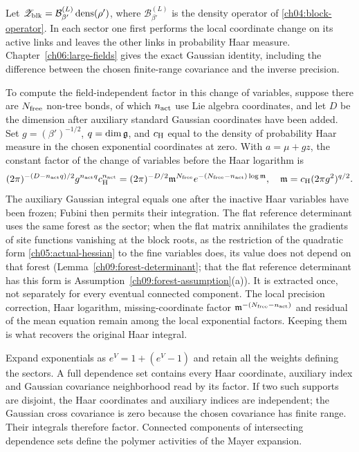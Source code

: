 Let
$\mathscr Z_{\rm blk}=\mathcal B^{(L)}_{\beta'}\operatorname{dens}(\rho')$,
where $\mathcal B^{(L)}_{\beta'}$ is the density operator of \eqref{ch04:block-operator}.
In each sector one first performs the local coordinate change
on its active links and leaves the other links in probability
Haar measure. Chapter~\ref{ch06:large-fields} gives the exact
Gaussian identity, including the difference between the chosen
finite-range covariance and the inverse precision.

To compute the field-independent factor in this change of variables,
suppose there are $N_{\rm free}$ non-tree
bonds, of which $n_{\rm act}$ use Lie algebra coordinates, and
let $D$ be the dimension after auxiliary standard Gaussian coordinates have
been added. Set $g=(\beta')^{-1/2}$, $q=\dim\mathfrak g$, and
$c_{\rm H}$ equal to the density of probability Haar measure
in the chosen exponential coordinates at zero.
With $a=\mu+gz$, the constant factor of the change of variables before the Haar
logarithm is
\[
 (2\pi)^{-(D-n_{\rm act}q)/2}g^{n_{\rm act}q}c_{\rm H}^{n_{\rm act}}
 =(2\pi)^{-D/2}\mathfrak m^{N_{\rm free}}
                  e^{-(N_{\rm free}-n_{\rm act})\log\mathfrak m},
 \quad
 \mathfrak m=c_{\rm H}(2\pi g^2)^{q/2}.
\]
The auxiliary Gaussian integral equals one after the inactive Haar
variables have been frozen; Fubini then permits their integration.
The flat reference determinant uses the same forest as the
sector; when the flat matrix annihilates the gradients of site functions vanishing at the block roots, as the restriction of the quadratic form \eqref{ch05:actual-hessian} to the fine variables does, its value does not depend on that forest (Lemma~\ref{ch09:forest-determinant}; that the flat reference determinant has this form is Assumption~\ref{ch09:forest-assumption}(a)). It is extracted once, not separately for every eventual
connected component. The local precision correction, Haar
logarithm, missing-coordinate factor $\mathfrak m^{-(N_{\rm free}-n_{\rm act})}$ and residual of the mean equation
remain among the local exponential factors.
Keeping them is what recovers the original Haar integral.

Expand exponentials as $e^V=1+(e^V-1)$ and retain all the
weights defining the sectors. A full dependence set contains
every Haar coordinate, auxiliary index and Gaussian covariance
neighborhood read by its factor. If two such supports are disjoint,
the Haar coordinates and auxiliary indices are independent; the Gaussian
cross covariance is zero because the chosen covariance has
finite range. Their integrals therefore factor.
Connected components of intersecting dependence sets define
the polymer activities of the Mayer expansion.


